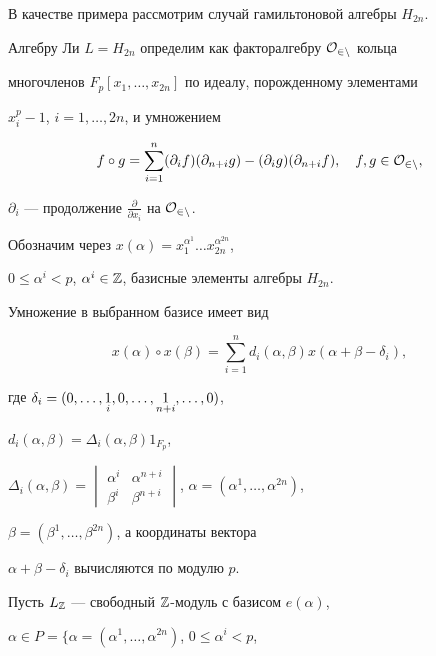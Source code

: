  


В качестве примера рассмотрим случай гамильтоновой алгебры $H_{2n}$. 


Алгебру Ли $L=H_{2n}$ определим как факторалгебру $\cal O_{2n}$ кольца 


многочленов $F_p[x_1,\dotsc,x_{2n}]$ по идеалу, порожденному элементами 


$x^p_i-1$, $i=1,\dotsc,2n$, и умножением 


$$ 


f\circ g=\sum^n_{i=1}(\partial_i f)(\partial_{n+i}g)- 


(\partial_i g)(\partial_{n+i}f),\quad f,g\in \cal O_{2n}, 


$$ 


$\partial_i$ --- продолжение $\frac{\partial}{\partial x_i}$ на $\cal 


O_{2n}$. 


 


Обозначим через $x(\alpha)=x^{\alpha^1}_1\dotsc x^{\alpha^{2n}}_{2n}$, 


$0\le\alpha^i<p$, $\alpha^i\in\Bbb Z$, базисные элементы алгебры $H_{2n}$. 


Умножение в выбранном базисе имеет вид 


$$ 


x(\alpha)\circ x(\beta)=\sum^n_{i=1}d_i(\alpha,\beta) 


x(\alpha+\beta-\delta_i), 


$$ 


где $\delta_i=(0,\dotsc,\underset{i}{1}{},0,\dotsc,\underset{n+i}{1}{},\dotsc,0)$, 


$d_i(\alpha,\beta)=\Delta_i(\alpha,\beta)1_{F_p}$, 


$\Delta_i(\alpha,\beta)=\begin{vmatrix} 


\alpha^i & \alpha^{n+i} \\ \beta^i & \beta^{n+i} 


\end{vmatrix}$, $\alpha=(\alpha^1,\dotsc,\alpha^{2n})$, 


$\beta=(\beta^1,\dotsc,\beta^{2n})$, а координаты вектора 


$\alpha+\beta-\delta_i$ вычисляются по модулю $p$. 


 


Пусть $L_{\Bbb Z}$ --- свободный $\Bbb Z$-модуль с базисом $e(\alpha)$, 


$\alpha\in P=\{\alpha=(\alpha^1,\dotsc,\alpha^{2n})$, $0\le\alpha^i<p$, 



